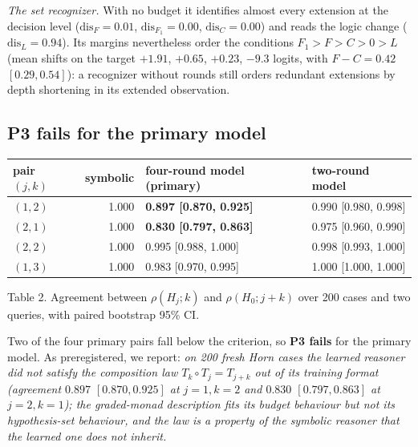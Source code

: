 \emph{The set recognizer.} With no budget it identifies almost every extension at the decision level (\(\mathrm{dis}_F=0.01\), \(\mathrm{dis}_{F_1}=0.00\), \(\mathrm{dis}_C=0.00\)) and reads the logic change (\(\mathrm{dis}_L=0.94\)). Its margins nevertheless order the conditions \(F_1>F>C>0>L\) (mean shifts on the target \(+1.91\), \(+0.65\), \(+0.23\), \(-9.3\) logits, with \(F-C=0.42\) \([0.29,0.54]\)): a recognizer without rounds still orders redundant extensions by depth shortening in its extended observation.

\subsection{P3 fails for the primary model}\label{p3-fails-for-the-primary-model}

{\def\LTcaptype{none} %
\begin{longtable}[]{@{}lrll@{}}
\toprule\noalign{}
pair \((j,k)\) & symbolic & four-round model (primary) & two-round model \\
\midrule\noalign{}
\endhead
\bottomrule\noalign{}
\endlastfoot
\((1,2)\) & 1.000 & \textbf{0.897 {[}0.870, 0.925{]}} & 0.990 {[}0.980, 0.998{]} \\
\((2,1)\) & 1.000 & \textbf{0.830 {[}0.797, 0.863{]}} & 0.975 {[}0.960, 0.990{]} \\
\((2,2)\) & 1.000 & 0.995 {[}0.988, 1.000{]} & 0.998 {[}0.993, 1.000{]} \\
\((1,3)\) & 1.000 & 0.983 {[}0.970, 0.995{]} & 1.000 {[}1.000, 1.000{]} \\
\end{longtable}
}

Table 2. Agreement between \(\rho(H_j;k)\) and \(\rho(H_0;j{+}k)\) over 200 cases and two queries, with paired bootstrap 95\% CI.

Two of the four primary pairs fall below the criterion, so \textbf{P3 fails} for the primary model. As preregistered, we report: \emph{on 200 fresh Horn cases the learned reasoner did not satisfy the composition law \(T_k\circ T_j=T_{j+k}\) out of its training format (agreement \(0.897\) \([0.870,0.925]\) at \(j=1,k=2\) and \(0.830\) \([0.797,0.863]\) at \(j=2,k=1\)); the graded-monad description fits its budget behaviour but not its hypothesis-set behaviour, and the law is a property of the symbolic reasoner that the learned one does not inherit.}

